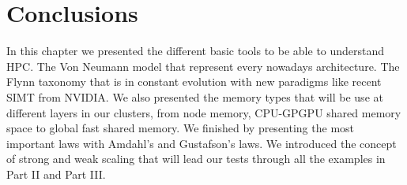 \section{Conclusions}

In this chapter we presented the different basic tools to be able to understand HPC. 
The Von Neumann model that represent every nowadays architecture. 
The Flynn taxonomy that is in constant evolution with new paradigms like recent SIMT from NVIDIA. 
We also presented the memory types that will be use at different layers in our clusters, from node memory, CPU-GPGPU shared memory space to global fast shared memory. 
We finished by presenting the most important laws with Amdahl's and Gustafson's laws.
We introduced the concept of strong and weak scaling that will lead our tests through all the examples in Part II and Part III. 
